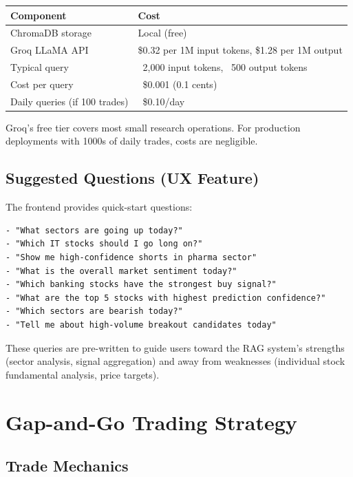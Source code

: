 \documentclass[11pt,a4paper]{article}
\begin{document}
\begin{table}[h]
\centering
\begin{tabular}{ll}
\toprule
\textbf{Component} & \textbf{Cost} \\
\midrule
ChromaDB storage & Local (free) \\
Groq LLaMA API & \$0.32 per 1M input tokens, \$1.28 per 1M output \\
Typical query & ~2,000 input tokens, ~500 output tokens \\
Cost per query & ~\$0.001 (0.1 cents) \\
Daily queries (if 100 trades) & ~\$0.10/day \\
\bottomrule
\end{tabular}
\end{table}

Groq's free tier covers most small research operations. For production deployments with 1000s of daily trades, costs are negligible.

\subsection{Suggested Questions (UX Feature)}

The frontend provides quick-start questions:

\begin{lstlisting}[language=text, caption=Suggested RAG Queries]
- "What sectors are going up today?"
- "Which IT stocks should I go long on?"
- "Show me high-confidence shorts in pharma sector"
- "What is the overall market sentiment today?"
- "Which banking stocks have the strongest buy signal?"
- "What are the top 5 stocks with highest prediction confidence?"
- "Which sectors are bearish today?"
- "Tell me about high-volume breakout candidates today"
\end{lstlisting}

These queries are pre-written to guide users toward the RAG system's strengths (sector analysis, signal aggregation) and away from weaknesses (individual stock fundamental analysis, price targets).

\section{Gap-and-Go Trading Strategy}

\subsection{Trade Mechanics}
\end{document}
